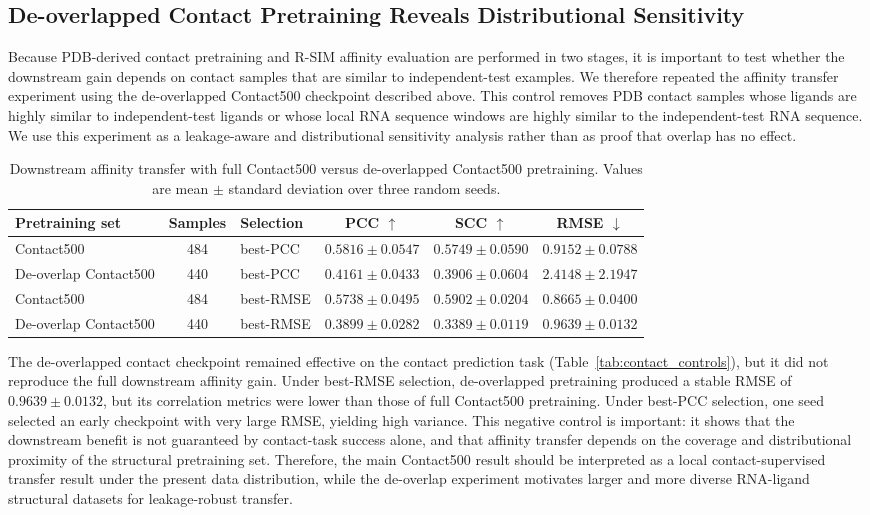 ﻿\documentclass[journal=jcisd8,manuscript=article]{achemso}
\begin{document}
\subsection{De-overlapped Contact Pretraining Reveals Distributional Sensitivity}

Because PDB-derived contact pretraining and R-SIM affinity evaluation are performed in two stages, it is important to test whether the downstream gain depends on contact samples that are similar to independent-test examples. We therefore repeated the affinity transfer experiment using the de-overlapped Contact500 checkpoint described above. This control removes PDB contact samples whose ligands are highly similar to independent-test ligands or whose local RNA sequence windows are highly similar to the independent-test RNA sequence. We use this experiment as a leakage-aware and distributional sensitivity analysis rather than as proof that overlap has no effect.

\begin{table}[t]
\centering
\caption{Downstream affinity transfer with full Contact500 versus de-overlapped Contact500 pretraining. Values are mean $\pm$ standard deviation over three random seeds.}
\label{tab:deoverlap_affinity}
\small
\setlength{\tabcolsep}{3pt}
\begin{tabular}{lclccc}
\toprule
Pretraining set & Samples & Selection & PCC $\uparrow$ & SCC $\uparrow$ & RMSE $\downarrow$ \\
\midrule
Contact500 & 484 & best-PCC & $0.5816 \pm 0.0547$ & $0.5749 \pm 0.0590$ & $0.9152 \pm 0.0788$ \\
De-overlap Contact500 & 440 & best-PCC & $0.4161 \pm 0.0433$ & $0.3906 \pm 0.0604$ & $2.4148 \pm 2.1947$ \\
Contact500 & 484 & best-RMSE & $0.5738 \pm 0.0495$ & $0.5902 \pm 0.0204$ & $0.8665 \pm 0.0400$ \\
De-overlap Contact500 & 440 & best-RMSE & $0.3899 \pm 0.0282$ & $0.3389 \pm 0.0119$ & $0.9639 \pm 0.0132$ \\
\bottomrule
\end{tabular}
\end{table}

The de-overlapped contact checkpoint remained effective on the contact prediction task (Table~\ref{tab:contact_controls}), but it did not reproduce the full downstream affinity gain. Under best-RMSE selection, de-overlapped pretraining produced a stable RMSE of $0.9639 \pm 0.0132$, but its correlation metrics were lower than those of full Contact500 pretraining. Under best-PCC selection, one seed selected an early checkpoint with very large RMSE, yielding high variance. This negative control is important: it shows that the downstream benefit is not guaranteed by contact-task success alone, and that affinity transfer depends on the coverage and distributional proximity of the structural pretraining set. Therefore, the main Contact500 result should be interpreted as a local contact-supervised transfer result under the present data distribution, while the de-overlap experiment motivates larger and more diverse RNA-ligand structural datasets for leakage-robust transfer.
\end{document}
